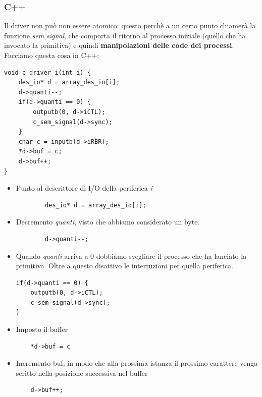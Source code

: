 \documentclass[11pt]{report}
\theoremstyle{definition}
\begin{document}
\subsubsection{C++} Il driver non può non essere atomico: questo perchè a un certo punto chiamerà la funzione \emph{sem$\_$signal}, che comporta il ritorno al processo iniziale (quello che ha invocato la primitiva) e quindi \textbf{manipolazioni delle code dei processi}. Facciamo questa cosa in C++:
\begin{verbatim}
void c_driver_i(int i) {
    des_io* d = array_des_io[i];	
    d->quanti--;
    if(d->quanti == 0) {
        outputb(0, d->iCTL);
        c_sem_signal(d->sync);    
    }
    char c = inputb(d->iRBR);
    *d->buf = c;
    d->buf++;
}
\end{verbatim}
\begin{itemize}
	\item Punto al descrittore di I/O della periferica \emph{i}
	\begin{verbatim}
		des_io* d = array_des_io[i]; 
	\end{verbatim}
	\item Decremento \emph{quanti}, visto che abbiamo considerato un byte.\begin{verbatim}
		d->quanti--;
	\end{verbatim}
	\item Quando \emph{quanti} arriva a $0$ dobbiamo svegliare il processo che ha lanciato la primitiva. Oltre a questo disattivo le interruzioni per quella periferica.
	\begin{verbatim}
if(d->quanti == 0) {
    outputb(0, d->iCTL);
    c_sem_signal(d->sync);    
}
	\end{verbatim}
\item Imposto il buffer
\begin{verbatim}
	*d->buf = c
\end{verbatim}
\item Incremento buf, in modo che alla prossima istanza il prossimo carattere venga scritto nella posizione successiva nel buffer
\begin{verbatim}
	d->buf++;
\end{verbatim}
\end{itemize}
\end{document}
